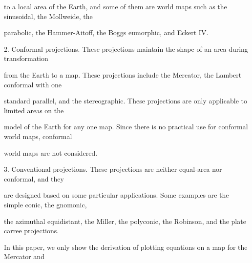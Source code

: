 \documentclass[a4paper,portrait,12pt]{article}
\begin{document}
\begin{flushleft}
to a local area of the Earth, and some of them are world maps such as the sinusoidal, the Mollweide, the
\end{flushleft}


\begin{flushleft}
parabolic, the Hammer-Aitoff, the Boggs eumorphic, and Eckert IV.
\end{flushleft}


\begin{flushleft}
2. Conformal projections. These projections maintain the shape of an area during transformation
\end{flushleft}


\begin{flushleft}
from the Earth to a map. These projections include the Mercator, the Lambert conformal with one
\end{flushleft}


\begin{flushleft}
standard parallel, and the stereographic. These projections are only applicable to limited areas on the
\end{flushleft}


\begin{flushleft}
model of the Earth for any one map. Since there is no practical use for conformal world maps, conformal
\end{flushleft}


\begin{flushleft}
world maps are not considered.
\end{flushleft}


\begin{flushleft}
3. Conventional projections. These projections are neither equal-area nor conformal, and they
\end{flushleft}


\begin{flushleft}
are designed based on some particular applications. Some examples are the simple conic, the gnomonic,
\end{flushleft}


\begin{flushleft}
the azimuthal equidistant, the Miller, the polyconic, the Robinson, and the plate carree projections.
\end{flushleft}


\begin{flushleft}
In this paper, we only show the derivation of plotting equations on a map for the Mercator and
\end{flushleft}
\end{document}
